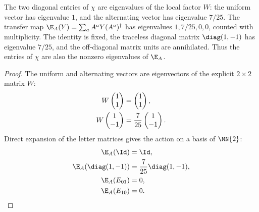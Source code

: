 \begin{lemma}%
    \label{thm:mpdo_bnt_label_rescaling_stable_spectral}
    \leanok
    The two diagonal entries of $\chi$ are eigenvalues of the local
    factor $W$: the uniform vector has eigenvalue $1$, and
    the alternating vector has eigenvalue $7/25$. The transfer map
    $\E_A(Y)=\sum_a A^aY(A^a)^\dagger$ has eigenvalues $1,7/25,0,0$,
    counted with multiplicity.
    The identity is fixed, the traceless diagonal matrix
    $\diag(1,-1)$ has eigenvalue $7/25$, and the
    off-diagonal matrix units are annihilated. Thus the entries of $\chi$
    are also the nonzero eigenvalues of $\E_A$.
\end{lemma}
\begin{proof}\leanok
    The uniform and alternating vectors are eigenvectors of the explicit
    $2\times2$ matrix $W$:
    \begin{align}
        W\begin{pmatrix}1\\1\end{pmatrix}
         & =\begin{pmatrix}1\\1\end{pmatrix},
        \notag                                             \\
        W\begin{pmatrix}1\\-1\end{pmatrix}
         & =\frac{7}{25}\begin{pmatrix}1\\-1\end{pmatrix}.
        \notag
    \end{align}
    Direct expansion of the letter matrices gives the action on a basis
    of $\MN{2}$:
    \begin{align}
        \E_A(\Id)         & =\Id,
        \notag                                        \\
        \E_A(\diag(1,-1)) & =\frac{7}{25}\diag(1,-1),
        \notag                                        \\
        \E_A(E_{01})      & =0,
        \notag                                        \\
        \E_A(E_{10})      & =0.
        \notag
    \end{align}
\end{proof}

